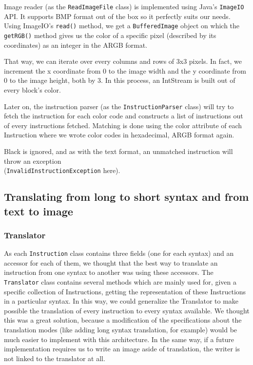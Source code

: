 \documentclass{article}
\begin{document}
Image reader (as the \texttt{ReadImageFile} class) is implemented using Java's \texttt{ImageIO} API. It supports BMP format out of the box so it perfectly suits our needs. Using ImageIO's \texttt{read()} method, we get a \texttt{BufferedImage} object on which the \texttt{getRGB()} method gives us the color of a specific pixel (described by its coordinates) as an integer in the ARGB format.

That way, we can iterate over every columns and rows of 3x3 pixels. In fact, we increment the x coordinate from 0 to the image width and the y coordinate from 0 to the image height, both by 3. In this process, an IntStream is built out of every block's color.

Later on, the instruction parser (as the \texttt{InstructionParser} class) will try to fetch the instruction for each color code and constructs a list of instructions out of every instructions fetched. Matching is done using the color attribute of each Instruction where we wrote color codes in hexadecimal, ARGB format again.

Black is ignored, and as with the text format, an unmatched instruction will throw an exception \\
(\texttt{InvalidInstructionException} here).

\subsection{Translating from long to short syntax and from text to image}

\subsubsection{Translator}

As each \texttt{Instruction} class contains three fields (one for each syntax) and an accessor for each of them, we thought that the best way to translate an instruction from one syntax to another was using these accessors. The \texttt{Translator} class contains several methods which are mainly used for, given a specific collection of Instructions, getting the representation of these Instructions in a particular syntax. In this way, we could generalize the Translator to make possible the translation of every instruction to every syntax available. We thought this was a great solution, because a modification of the specifications about the translation modes (like adding long syntax translation, for example) would be much easier to implement with this architecture. In the same way, if a future implementation requires us to write an image aside of translation, the writer is not linked to the translator at all.
\end{document}
